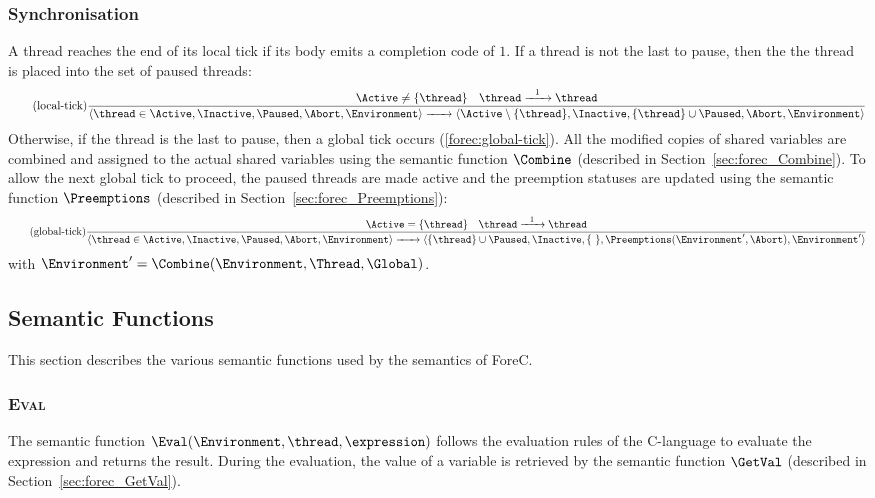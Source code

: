 \subsubsection{Synchronisation}
A thread reaches the end of its local tick if
its body emits a completion code of $1$.
If a thread is not the last to pause, then the 
the thread is placed into the set of paused threads:
\begin{equation*}
	\tag{local-tick}
	\label{forec:local-tick}
	\frac{
			\Active \neq \lbrace \thread \rbrace
			\quad
			\thread \xrightarrow{~~1~~} \thread
		}{
			\langle \thread \in \Active, \Inactive, \Paused, \Abort, \Environment \rangle
				\xrightarrow{~~~~~} 
			\langle \Active \setminus \lbrace \thread \rbrace, \Inactive, \lbrace \thread \rbrace \cup \Paused, \Abort, \Environment \rangle
		}
\end{equation*}
Otherwise, if the thread is the last to pause, then a global 
tick occurs (\ref{forec:global-tick}). All the modified copies of 
shared variables are combined and assigned to the actual shared 
variables using the semantic function $\Combine$ (described in 
Section~\ref{sec:forec_Combine}). To allow the next global tick
to proceed, the paused threads are made active and the preemption
statuses are updated using the semantic function 
$\Preemptions$ (described in Section~\ref{sec:forec_Preemptions}):
\begin{equation*}
	\tag{global-tick}
	\label{forec:global-tick}
	\frac{
			\Active = \lbrace \thread \rbrace
			\quad
			\thread \xrightarrow{~~1~~} \thread
		}{
			\langle \thread \in \Active, \Inactive, \Paused, \Abort, \Environment \rangle
				\xrightarrow{~~~~~} 
			\langle \lbrace \thread \rbrace \cup \Paused, \Inactive, \lbrace ~ \rbrace, \Preemptions(\Environment', \Abort), \Environment' \rangle
		}
\end{equation*}
with $\Environment' = \Combine(\Environment, \Thread, \Global)$.


\subsection{Semantic Functions}
This section describes the various semantic functions 
used by the semantics of ForeC.

\subsubsection{\textsc{Eval}}
\label{sec:forec_Eval}
The semantic function $\Eval(\Environment, \thread, \expression)$ 
follows the evaluation rules of the C-language to 
evaluate the expression \expression{} and returns 
the result. During the evaluation, the value of a 
variable is retrieved by the semantic function $\GetVal$ 
(described in Section~\ref{sec:forec_GetVal}).

